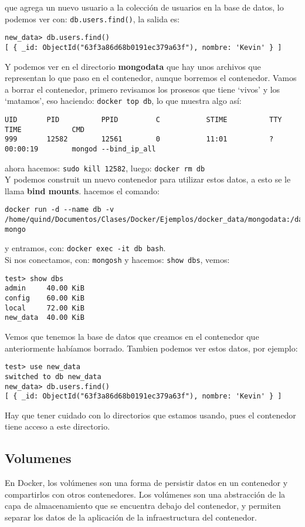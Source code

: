 \documentclass{article}
\begin{document}
que agrega un nuevo usuario a la colección de usuarios en la base de datos, lo podemos ver con: \lstinline{db.users.find()}, la salida es:
\begin{lstlisting}[numbers=none]
new_data> db.users.find()
[ { _id: ObjectId("63f3a86d68b0191ec379a63f"), nombre: 'Kevin' } ]
\end{lstlisting}
Y podemos ver en el directorio \textbf{mongodata} que hay unos archivos que representan lo que paso en el contenedor, aunque borremos el contenedor.
Vamos a borrar el contenedor, primero revisamos los prosesos que tiene \enquote*{vivos} y los \enquote*{matamos}, eso haciendo: \lstinline{docker top db}, lo que muestra algo así:
\begin{lstlisting}[numbers=none]
UID       PID          PPID         C           STIME          TTY            TIME            CMD
999       12582        12561        0           11:01          ?              00:00:19        mongod --bind_ip_all\end{lstlisting}
 ahora hacemos: \lstinline{sudo kill 12582}, luego: \lstinline{docker rm db}\\
Y podemos construit un nuevo contenedor para utilizar estos datos, a esto se le llama \textbf{bind mounts}. 
hacemos el comando:
\begin{lstlisting}
docker run -d --name db -v /home/quind/Documentos/Clases/Docker/Ejemplos/docker_data/mongodata:/data/db mongo\end{lstlisting}
y entramos, con: \lstinline{docker exec -it db bash}.\\
Si nos conectamos, con: \lstinline{mongosh} y hacemos: \lstinline{show dbs}, vemos:
\begin{lstlisting}[numbers=none]
test> show dbs
admin     40.00 KiB
config    60.00 KiB
local     72.00 KiB
new_data  40.00 KiB\end{lstlisting} 
Vemos que tenemos la base de datos que creamos en el contenedor que anteriormente habíamos borrado.
Tambien podemos ver estos datos, por ejemplo:
\begin{lstlisting}[numbers=none]
test> use new_data
switched to db new_data
new_data> db.users.find()
[ { _id: ObjectId("63f3a86d68b0191ec379a63f"), nombre: 'Kevin' } ]           \end{lstlisting}
Hay que tener cuidado con lo directorios que estamos usando, pues el contenedor tiene acceso a este directorio.

\subsection{Volumenes}
En Docker, los volúmenes son una forma de persistir datos en un contenedor y compartirlos con otros contenedores. Los volúmenes son una abstracción de la capa de almacenamiento que se encuentra debajo del contenedor, y permiten separar los datos de la aplicación de la infraestructura del contenedor.\\
\end{document}
